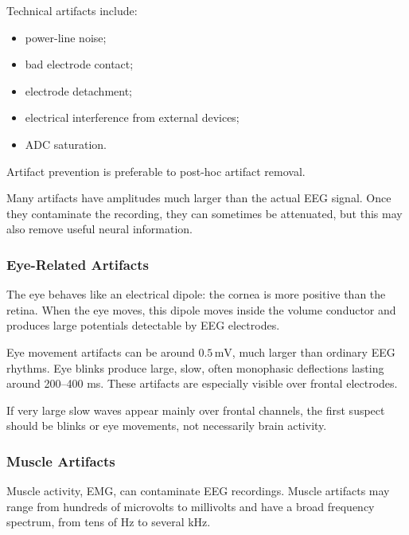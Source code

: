 Technical artifacts include:

\begin{itemize}[noitemsep]
    \item power-line noise;
    \item bad electrode contact;
    \item electrode detachment;
    \item electrical interference from external devices;
    \item ADC saturation.
\end{itemize}

Artifact prevention is preferable to post-hoc artifact removal.

\begin{authornote}
Many artifacts have amplitudes much larger than the actual EEG signal. Once they contaminate the recording, they can sometimes be attenuated, but this may also remove useful neural information.
\end{authornote}

\subsubsection{Eye-Related Artifacts}

The eye behaves like an electrical dipole: the cornea is more positive than the retina. When the eye moves, this dipole moves inside the volume conductor and produces large potentials detectable by EEG electrodes.

Eye movement artifacts can be around $0.5\,\text{mV}$, much larger than ordinary EEG rhythms. Eye blinks produce large, slow, often monophasic deflections lasting around 200--400 ms. These artifacts are especially visible over frontal electrodes.

\begin{authornote}
If very large slow waves appear mainly over frontal channels, the first suspect should be blinks or eye movements, not necessarily brain activity.
\end{authornote}

\subsubsection{Muscle Artifacts}

Muscle activity, EMG, can contaminate EEG recordings. Muscle artifacts may range from hundreds of microvolts to millivolts and have a broad frequency spectrum, from tens of Hz to several kHz.

